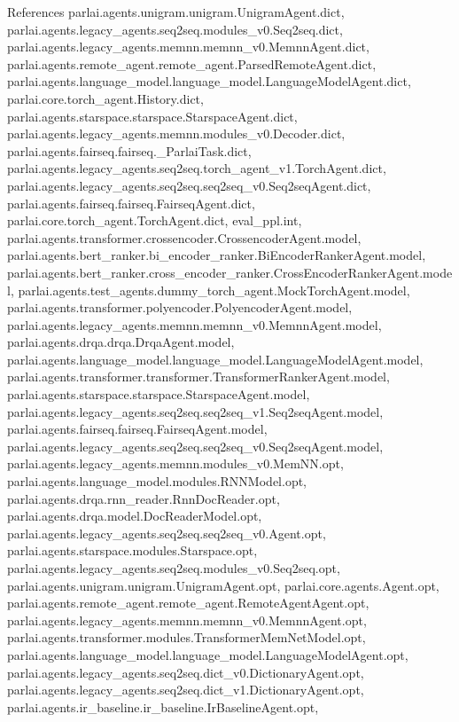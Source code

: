 References parlai.\+agents.\+unigram.\+unigram.\+Unigram\+Agent.\+dict, parlai.\+agents.\+legacy\+\_\+agents.\+seq2seq.\+modules\+\_\+v0.\+Seq2seq.\+dict, parlai.\+agents.\+legacy\+\_\+agents.\+memnn.\+memnn\+\_\+v0.\+Memnn\+Agent.\+dict, parlai.\+agents.\+remote\+\_\+agent.\+remote\+\_\+agent.\+Parsed\+Remote\+Agent.\+dict, parlai.\+agents.\+language\+\_\+model.\+language\+\_\+model.\+Language\+Model\+Agent.\+dict, parlai.\+core.\+torch\+\_\+agent.\+History.\+dict, parlai.\+agents.\+starspace.\+starspace.\+Starspace\+Agent.\+dict, parlai.\+agents.\+legacy\+\_\+agents.\+memnn.\+modules\+\_\+v0.\+Decoder.\+dict, parlai.\+agents.\+fairseq.\+fairseq.\+\_\+\+Parlai\+Task.\+dict, parlai.\+agents.\+legacy\+\_\+agents.\+seq2seq.\+torch\+\_\+agent\+\_\+v1.\+Torch\+Agent.\+dict, parlai.\+agents.\+legacy\+\_\+agents.\+seq2seq.\+seq2seq\+\_\+v0.\+Seq2seq\+Agent.\+dict, parlai.\+agents.\+fairseq.\+fairseq.\+Fairseq\+Agent.\+dict, parlai.\+core.\+torch\+\_\+agent.\+Torch\+Agent.\+dict, eval\+\_\+ppl.\+int, parlai.\+agents.\+transformer.\+crossencoder.\+Crossencoder\+Agent.\+model, parlai.\+agents.\+bert\+\_\+ranker.\+bi\+\_\+encoder\+\_\+ranker.\+Bi\+Encoder\+Ranker\+Agent.\+model, parlai.\+agents.\+bert\+\_\+ranker.\+cross\+\_\+encoder\+\_\+ranker.\+Cross\+Encoder\+Ranker\+Agent.\+model, parlai.\+agents.\+test\+\_\+agents.\+dummy\+\_\+torch\+\_\+agent.\+Mock\+Torch\+Agent.\+model, parlai.\+agents.\+transformer.\+polyencoder.\+Polyencoder\+Agent.\+model, parlai.\+agents.\+legacy\+\_\+agents.\+memnn.\+memnn\+\_\+v0.\+Memnn\+Agent.\+model, parlai.\+agents.\+drqa.\+drqa.\+Drqa\+Agent.\+model, parlai.\+agents.\+language\+\_\+model.\+language\+\_\+model.\+Language\+Model\+Agent.\+model, parlai.\+agents.\+transformer.\+transformer.\+Transformer\+Ranker\+Agent.\+model, parlai.\+agents.\+starspace.\+starspace.\+Starspace\+Agent.\+model, parlai.\+agents.\+legacy\+\_\+agents.\+seq2seq.\+seq2seq\+\_\+v1.\+Seq2seq\+Agent.\+model, parlai.\+agents.\+fairseq.\+fairseq.\+Fairseq\+Agent.\+model, parlai.\+agents.\+legacy\+\_\+agents.\+seq2seq.\+seq2seq\+\_\+v0.\+Seq2seq\+Agent.\+model, parlai.\+agents.\+legacy\+\_\+agents.\+memnn.\+modules\+\_\+v0.\+Mem\+N\+N.\+opt, parlai.\+agents.\+language\+\_\+model.\+modules.\+R\+N\+N\+Model.\+opt, parlai.\+agents.\+drqa.\+rnn\+\_\+reader.\+Rnn\+Doc\+Reader.\+opt, parlai.\+agents.\+drqa.\+model.\+Doc\+Reader\+Model.\+opt, parlai.\+agents.\+legacy\+\_\+agents.\+seq2seq.\+seq2seq\+\_\+v0.\+Agent.\+opt, parlai.\+agents.\+starspace.\+modules.\+Starspace.\+opt, parlai.\+agents.\+legacy\+\_\+agents.\+seq2seq.\+modules\+\_\+v0.\+Seq2seq.\+opt, parlai.\+agents.\+unigram.\+unigram.\+Unigram\+Agent.\+opt, parlai.\+core.\+agents.\+Agent.\+opt, parlai.\+agents.\+remote\+\_\+agent.\+remote\+\_\+agent.\+Remote\+Agent\+Agent.\+opt, parlai.\+agents.\+legacy\+\_\+agents.\+memnn.\+memnn\+\_\+v0.\+Memnn\+Agent.\+opt, parlai.\+agents.\+transformer.\+modules.\+Transformer\+Mem\+Net\+Model.\+opt, parlai.\+agents.\+language\+\_\+model.\+language\+\_\+model.\+Language\+Model\+Agent.\+opt, parlai.\+agents.\+legacy\+\_\+agents.\+seq2seq.\+dict\+\_\+v0.\+Dictionary\+Agent.\+opt, parlai.\+agents.\+legacy\+\_\+agents.\+seq2seq.\+dict\+\_\+v1.\+Dictionary\+Agent.\+opt, parlai.\+agents.\+ir\+\_\+baseline.\+ir\+\_\+baseline.\+Ir\+Baseline\+Agent.\+opt, 
